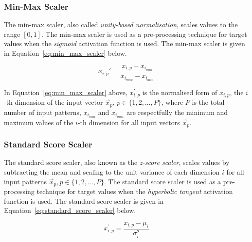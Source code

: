 \subsubsection{Min-Max Scaler}\label{sec:anns:an:input:min_max_scaler}

The min-max scaler, also called \textit{unity-based normalisation}, scales values to the range $[0,1]$. The min-max scaler is used as a pre-processing technique for target values when the \textit{sigmoid}  activation function is used. The min-max scaler is given in Equation~\eqref{eq:min_max_scaler} below.

\begin{equation}
    x_{i,p}'  = \frac{x_{i,p} - x_{i_{min}}}{x_{i_{max}} - x_{i_{min}}}
    \label{eq:min_max_scaler}
\end{equation}

\noindent
In Equation~\eqref{eq:min_max_scaler} above, $x_{i,p}^{'}$ is the normalised form of $x_{i,p}$, the $i$-th dimension of the input vector $\vec{x}_p$, $p \in \{1,2, \dots, P \}$, where $P$ is the total number of input patterns, $x_{i_{min}}$ and $x_{i_{max}}$ are respectfully the minimum and maximum values of the $i$-th dimension for all input vectors $\vec{x}_p$.

\subsubsection{Standard Score Scaler}\label{sec:anns:an:input:standard_score_scaler}

The standard score scaler, also known as the \textit{z-score scaler}, scales values by subtracting the mean and scaling to the unit variance of each dimension $i$ for all input patterns $\vec{x}_p, p \in \{1,2, \dots, P\}$. The standard score scaler is used as a pre-processing technique for target values when the \textit{hyperbolic tangent} activation function is used. The standard score scaler is given in Equation~\eqref{eq:standard_score_scaler} below.

\begin{equation}
    x_{i,p}^{'} = \frac{x_{i,p} - \mu_i}{\sigma^2_i}
    \label{eq:standard_score_scaler}
\end{equation}

